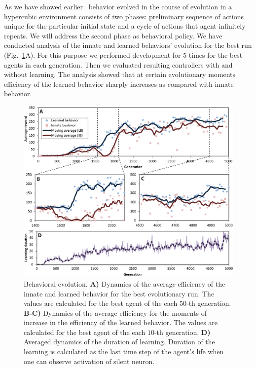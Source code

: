 \documentclass[letterpaper]{article}
\begin{document}
As we have showed earlier~\citep{LakhmanBurtsev2013} behavior evolved in the course of evolution in a hypercubic environment consists of two phases: preliminary sequence of actions unique for the particular initial state and a cycle of actions that agent infinitely repeats. We will address the second phase as behavioral policy. We have conducted analysis of the innate and learned behaviors' evolution for the best run (Fig.~\ref{Behavior_Evolution}A). For this purpose we performed development for 5 times for the best agents in each generation. Then we evaluated resulting controllers with and without learning. The analysis showed that at certain evolutionary moments efficiency of the learned behavior sharply increases as compared with innate behavior.

\begin{figure}[!t]
\begin{center}
\includegraphics[width=16cm]{Fig3_Behavior_Evolution.eps}
\caption{Behavioral evolution. \textbf{A)} Dynamics of the average efficiency of the innate and learned behavior for the best evolutionary run. The values are calculated for the best agent of the each $50$-th generation. \textbf{B-C)} Dynamics of the average efficiency for the moments of increase in the efficiency of the learned behavior. The values are calculated for the best agent of the each $10$-th generation. \textbf{D)} Averaged dynamics of the duration of learning. Duration of the learning is calculated as the last time step of the agent's life when one can observe activation of silent neuron.}
\label{Behavior_Evolution}
\end{center}
\end{figure}             
\end{document}
